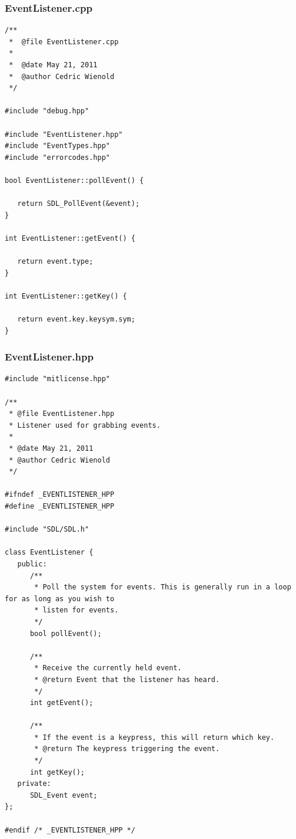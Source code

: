 \documentclass[12pt]{article}
\begin{document}
\subsubsection{EventListener.cpp}
\begin{lstlisting}[breaklines]
/**
 *  @file EventListener.cpp
 *
 *  @date May 21, 2011
 *  @author Cedric Wienold
 */

#include "debug.hpp"

#include "EventListener.hpp"
#include "EventTypes.hpp"
#include "errorcodes.hpp"

bool EventListener::pollEvent() {

   return SDL_PollEvent(&event);
}

int EventListener::getEvent() {

   return event.type;
}

int EventListener::getKey() {

   return event.key.keysym.sym;
}
\end{lstlisting}
\subsubsection{EventListener.hpp}
\begin{lstlisting}[breaklines]
#include "mitlicense.hpp"

/**
 * @file EventListener.hpp
 * Listener used for grabbing events.
 *
 * @date May 21, 2011
 * @author Cedric Wienold
 */

#ifndef _EVENTLISTENER_HPP
#define _EVENTLISTENER_HPP

#include "SDL/SDL.h"

class EventListener {
   public:
      /**
       * Poll the system for events. This is generally run in a loop for as long as you wish to
       * listen for events.
       */
      bool pollEvent();

      /**
       * Receive the currently held event.
       * @return Event that the listener has heard.
       */
      int getEvent();

      /**
       * If the event is a keypress, this will return which key.
       * @return The keypress triggering the event.
       */
      int getKey();
   private:
      SDL_Event event;
};

#endif /* _EVENTLISTENER_HPP */
\end{lstlisting}
\end{document}
